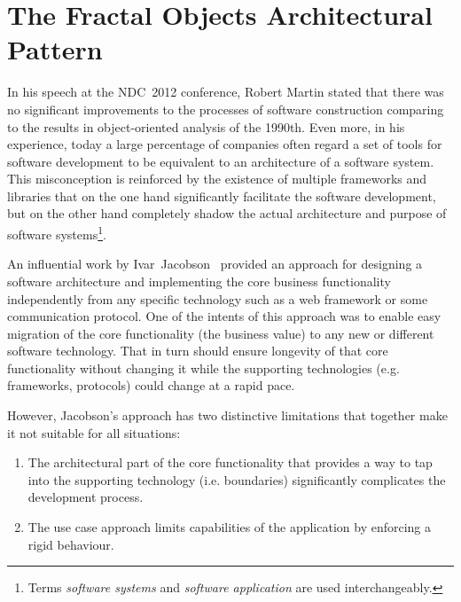 \chapter{The Fractal Objects Architectural Pattern}\label{ch01:00}


  In his speech at the NDC~2012 conference, Robert Martin stated that there was no significant improvements to the processes of software construction comparing to the results in object-oriented analysis of the 1990th. 
  Even more, in his experience, today a large percentage of companies often regard a set of tools for software development to be equivalent to an architecture of a software system.
  This misconception is reinforced by the existence of multiple frameworks and libraries that on the one hand significantly facilitate the software development, but on the other hand completely shadow the actual architecture and purpose of software systems\footnote{Terms \emph{software systems} and \emph{software application} are used interchangeably.}.

  An influential work by Ivar~Jacobson~\cite{jacobson1992} provided an approach for designing a software architecture and implementing the core business functionality independently from any specific technology such as a web framework or some communication protocol.
  One of the intents of this approach was to enable easy migration of the core functionality (the business value) to any new or different software technology.
  That in turn should ensure longevity of that core functionality without changing it while the supporting technologies (e.g. frameworks, protocols) could change at a rapid pace.

  However, Jacobson's approach has two distinctive limitations that together make it not suitable for all situations:  
  \begin{enumerate}
   \item The architectural part of the core functionality that provides a way to tap into the supporting technology (i.e. boundaries) significantly complicates the development process.
   \item The use case approach limits capabilities of the application by enforcing a rigid behaviour.
  \end{enumerate}
  
